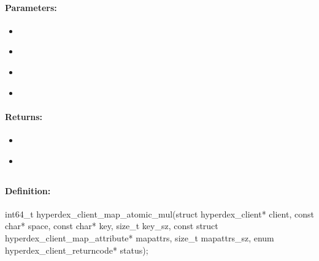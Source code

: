\paragraph{Parameters:}
\begin{itemize}[noitemsep]
\item {}\\

\item {}\\

\item {}\\

\item {}\\

\end{itemize}

\paragraph{Returns:}
\begin{itemize}[noitemsep]
\item {}\\

\item {}\\

\end{itemize}

\pagebreak
\subsection{}
\label{api:c:map_atomic_mul}


\paragraph{Definition:}
\begin{ccode}
int64_t hyperdex_client_map_atomic_mul(struct hyperdex_client* client,
        const char* space,
        const char* key, size_t key_sz,
        const struct hyperdex_client_map_attribute* mapattrs, size_t mapattrs_sz,
        enum hyperdex_client_returncode* status);
\end{ccode}


